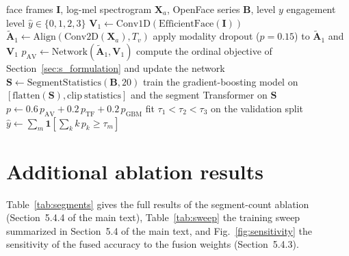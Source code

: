 \documentclass[pdflatex,sn-basic]{sn-jnl}
\newcommand{\ournet}{AVB-Engage}
\begin{document}
\begin{algorithm}[t]
\caption{\ournet{} training and inference}\label{alg:s_ournet}
\begin{algorithmic}[1]
\Require face frames $\mathbf{I}$, log-mel spectrogram $\mathbf{X}_a$, OpenFace series $\mathbf{B}$, level $y$
\Ensure engagement level $\hat{y} \in \{0,1,2,3\}$
\State $\mathbf{V}_1 \gets \mathrm{Conv1D}(\mathrm{EfficientFace}(\mathbf{I}))$
\State $\tilde{\mathbf{A}}_1 \gets \mathrm{Align}(\mathrm{Conv2D}(\mathbf{X}_a), T_v)$
\State apply modality dropout ($p = 0.15$) to $\tilde{\mathbf{A}}_1$ and $\mathbf{V}_1$
\State $p_{\mathrm{AV}} \gets \mathrm{Network}(\tilde{\mathbf{A}}_1, \mathbf{V}_1)$ 
\State compute the ordinal objective of Section~\ref{sec:s_formulation} and update the network
\EndFor
\State $\mathbf{S} \gets \mathrm{SegmentStatistics}(\mathbf{B}, 20)$
\State train the gradient-boosting model on $[\mathrm{flatten}(\mathbf{S}), \mathrm{clip\ statistics}]$ and the segment Transformer on $\mathbf{S}$
\State $p \gets 0.6\,p_{\mathrm{AV}} + 0.2\,p_{\mathrm{TF}} + 0.2\,p_{\mathrm{GBM}}$
\State fit $\tau_1 < \tau_2 < \tau_3$ on the validation split
\State $\hat{y} \gets \sum_{m} \mathbf{1}[\sum_k k\,p_k \ge \tau_m]$
\end{algorithmic}
\end{algorithm}

\section{Additional ablation results}\label{sec:s_abl}

Table~\ref{tab:segments} gives the full results of the segment-count ablation (Section~5.4.4 of the main text), Table~\ref{tab:sweep} the training sweep summarized in Section~5.4 of the main text, and Fig.~\ref{fig:sensitivity} the sensitivity of the fused accuracy to the fusion weights (Section~5.4.3).
\end{document}
